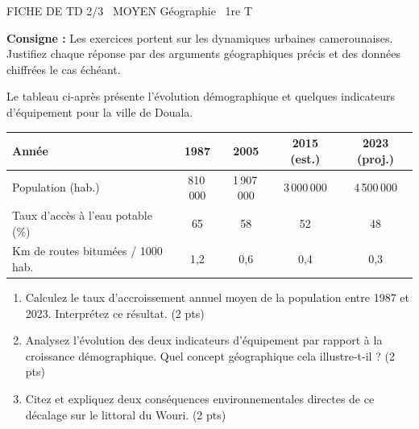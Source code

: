 \documentclass[11pt]{article}
\begin{document}
\begin{tcolorbox}[enhanced,colback=popink,colframe=popink,arc=10pt,boxrule=0pt,left=12pt,right=12pt,top=9pt,bottom=9pt]
{\color{white}\popxbold\small FICHE DE TD 2/3 \textbullet\ MOYEN \hfill Géographie \textbullet\ 1re T\par}
\end{tcolorbox}
\vspace{4pt}
\noindent\textbf{Consigne :} Les exercices portent sur les dynamiques urbaines camerounaises. Justifiez chaque réponse par des arguments géographiques précis et des données chiffrées le cas échéant.

\begin{exercice}
\label{exo:douala}
Le tableau ci-après présente l'évolution démographique et quelques indicateurs d'équipement pour la ville de Douala.

\begin{center}
\begin{tabular}{lcccc}
\toprule
\textbf{Année} & \textbf{1987} & \textbf{2005} & \textbf{2015 (est.)} & \textbf{2023 (proj.)} \\
\midrule
Population (hab.) & 810\,000 & 1\,907\,000 & 3\,000\,000 & 4\,500\,000 \\
Taux d'accès à l'eau potable (\%) & 65 & 58 & 52 & 48 \\
Km de routes bitumées / 1000 hab. & 1,2 & 0,6 & 0,4 & 0,3 \\
\bottomrule
\end{tabular}
\end{center}
\vspace{0.5em}
\begin{enumerate}
    \item Calculez le taux d'accroissement annuel moyen de la population entre 1987 et 2023. Interprétez ce résultat. \hfill (2 pts)
    \item Analysez l'évolution des deux indicateurs d'équipement par rapport à la croissance démographique. Quel concept géographique cela illustre-t-il ? \hfill (2 pts)
    \item Citez et expliquez deux conséquences environnementales directes de ce décalage sur le littoral du Wouri. \hfill (2 pts)
\end{enumerate}
\end{exercice}
\end{document}
